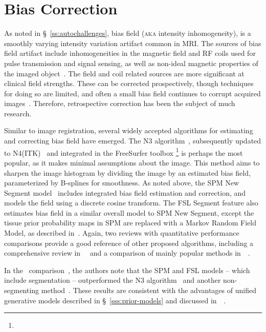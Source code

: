 \section{Bias Correction}\label{s:pre-bias}
As noted in \S~\ref{ss:autochallenges}, bias field (\textsc{aka} intensity inhomogeneity),
is a smoothly varying intensity variation artifact common in MRI.
The sources of bias field artifact include
inhomogeneities in the magnetic field and RF coils used for pulse transmission and signal sensing,
as well as non-ideal magnetic properties of the imaged object~\cite{Vovk2007}.
The field and coil related sources are more significant at clinical field strengths.
These can be corrected prospectively, though techniques for doing so are limited,
and often a small bias field continues to corrupt acquired images~\cite{Vovk2007}.
Therefore, retrospective correction has been the subject of much research.
\par
Similar to image registration,
several widely accepted algorithms for estimating and correcting bias field have emerged.
The N3 algorithm~\cite{Sled1998}, subsequently updated to N4(ITK)~\cite{Tustison2010}
and integrated in the FreeSurfer toolbox%
\footnote{}
is perhaps the most popular, as it makes minimal assumptions about the image.
This method aims to sharpen the image histogram by dividing the image by an estimated bias field,
parameterized by B-splines for smoothness.
As noted above, the SPM New Segment model~\cite{Ashburner2005}
includes integrated bias field estimation and correction,
and models the field using a discrete cosine transform.
The FSL Segment feature also estimates bias field in a similar overall model to SPM New Segment,
except the tissue prior probability maps in SPM are replaced with a Markov Random Field Model,
as described in~\cite{Zhang2001}.
Again, two reviews with quantitative performance comparisons
provide a good reference of other proposed algorithms,
including a comprehensive review in~\citeyear{Belaroussi2006}~\cite{Belaroussi2006}
and a comparison of mainly popular methods in~\citeyear{Ganzetti2016}~\cite{Ganzetti2016}.
\par
In the~\citeyear{Ganzetti2016} comparison~\cite{Ganzetti2016},
the authors note that the SPM and FSL models -- which include segmentation --
outperformed the N3 algorithm~\cite{Sled1998} and another non-segmenting method~\cite{Dawant1993}.
These results are consistent with
the advantages of unified generative models described in \S~\ref{sss:prior-models}
and discussed in~~\cite{Ashburner2005}.
